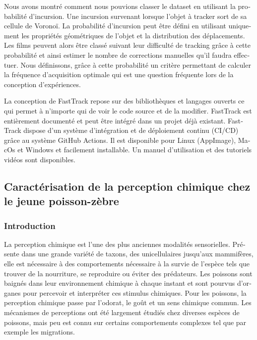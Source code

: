 \begin{otherlanguage}{french}
Nous avons montré comment nous pouvions classer le dataset en utilisant la probabilité d'incursion. Une incursion survenant lorsque l'objet à tracker sort de sa cellule de Voronoï. La probabilité d'incursion peut être défini en utilisant uniquement les propriétés géométriques de l'objet et la distribution des déplacements. Les films peuvent alors être classé suivant leur difficulté de tracking grâce à cette probabilité et ainsi estimer le nombre de corrections manuelles qu'il faudra effectuer. Nous définissons, grâce à cette probabilité un critère permettant de calculer la fréquence d'acquisition optimale qui est une question fréquente lors de la conception d'expériences.

La conception de FastTrack repose sur des bibliothèques et langages ouverts ce qui permet à n'importe qui de voir le code source et de la modifier. FastTrack est entièrement documenté et peut être intégré dans un projet déjà existant. FastTrack dispose d'un système d'intégration et de déploiement continu (CI/CD) grâce au système GitHub Actions. Il est disponible pour Linux (AppImage), MacOs et Windows et facilement installable. Un manuel d'utilisation et des tutoriels vidéos sont disponibles.


\subsection*{Caractérisation de la perception chimique chez le jeune poisson-zèbre}

\subsubsection*{Introduction}
La perception chimique est l'une des plus anciennes modalités sensorielles. Présente dans une grande variété de taxons, des unicellulaires jusqu'aux mammifères, elle est nécessaire à des comportements nécessaire à la survie de l'espèce tels que trouver de la nourriture, se reproduire ou éviter des prédateurs. Les poissons sont baignés dans leur environnement chimique à chaque instant et sont pourvus d'organes pour percevoir et interpréter ces stimulus chimiques. Pour les poissons, la perception chimique passe par l'odorat, le goût et un sens chimique commun. Les mécanismes de perceptions ont été largement étudiés chez diverses espèces de poissons, mais peu est connu sur certains comportements complexes tel que par exemple les migrations.


\end{otherlanguage}
